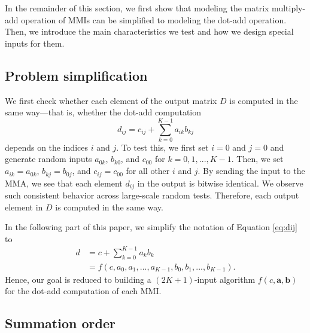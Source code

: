 In the remainder of this section, we first show that modeling the matrix multiply-add operation of MMIs can be simplified to modeling the dot-add operation. Then, we introduce the main characteristics we test and how we design special inputs for them.

\subsection{Problem simplification}

We first check whether each element of the output matrix $D$ is computed in the same way---that is, whether the dot-add computation 
\begin{equation}
\label{eq:dij}
    d_{ij} = c_{ij}+\sum_{k=0}^{K-1} a_{ik}b_{kj}
\end{equation}
depends on the indices $i$ and $j$. To test this, we first set $i=0$ and $j=0$ and generate random inputs $a_{0k}$, $b_{k0}$, and $c_{00}$ for $k=0,1,...,K-1$. Then, we set $a_{ik}=a_{0k}$, $b_{kj}=b_{0j}$, and $c_{ij}=c_{00}$ for all other $i$ and $j$. By sending the input to the MMA, we see that each element $d_{ij}$ in the output is bitwise identical. We observe such consistent behavior across large-scale random tests. Therefore, each output element in $D$ is computed in the same way.

In the following part of this paper, we simplify the notation of Equation \ref{eq:dij} to
\begin{equation}
\label{eq:d}
\begin{split}
    d &= c + \sum_{k=0}^{K-1}a_{k}b_{k} \\
     &= f(c, a_0, a_1, ..., a_{K-1}, b_0, b_1, ..., b_{K-1}).
\end{split}
\end{equation}
Hence, our goal is reduced to building a $(2K+1)$-input algorithm $f(c, \mathbf{a}, \mathbf{b})$ for the dot-add computation of each MMI.

\subsection{Summation order}


